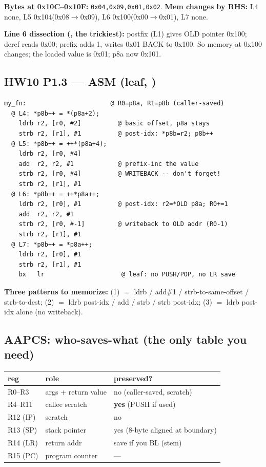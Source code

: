 \textbf{Bytes at 0x10C--0x10F:} \texttt{0x04,0x09,0x01,0x02}.
\textbf{Mem changes by RHS:} L4 none, L5 0x104(0x08$\to$0x09), L6 0x100(0x00$\to$0x01), L7 none.

\textbf{Line 6 dissection (, the trickiest):}
postfix  (L1) gives OLD pointer 0x100; deref reads 0x00; prefix
\cee{++} adds 1, writes 0x01 BACK to 0x100. So memory at 0x100 changes; the
loaded value is 0x01; p8a now 0x101.

\subsection{HW10 P1.3 --- ASM (leaf, )}
\begin{lstlisting}
my_fn:                       @ R0=p8a, R1=p8b (caller-saved)
  @ L4: *p8b++ = *(p8a+2);
    ldrb r2, [r0, #2]          @ basic offset, p8a stays
    strb r2, [r1], #1          @ post-idx: *p8b=r2; p8b++
  @ L5: *p8b++ = ++*(p8a+4);
    ldrb r2, [r0, #4]
    add  r2, r2, #1            @ prefix-inc the value
    strb r2, [r0, #4]          @ WRITEBACK -- don't forget!
    strb r2, [r1], #1
  @ L6: *p8b++ = ++*p8a++;
    ldrb r2, [r0], #1          @ post-idx: r2=*OLD p8a; R0+=1
    add  r2, r2, #1
    strb r2, [r0, #-1]         @ writeback to OLD addr (R0-1)
    strb r2, [r1], #1
  @ L7: *p8b++ = *p8a++;
    ldrb r2, [r0], #1
    strb r2, [r1], #1
    bx   lr                     @ leaf: no PUSH/POP, no LR save
\end{lstlisting}

\textbf{Three patterns to memorize:}
(1)  $=$ ldrb / add\#1 / strb-to-same-offset / strb-to-dest;
(2)      $=$ ldrb post-idx / add / strb \asm{[\#-1]} / strb post-idx;
(3)        $=$ ldrb post-idx alone (no writeback).

\subsection{AAPCS: who-saves-what (the only table you need)}
\begin{tabular}{@{}lll@{}}
\toprule
reg & role & preserved? \\
\midrule
R0--R3 & args + return value & no (caller-saved, scratch) \\
R4--R11& callee scratch       & \textbf{yes} (PUSH if used) \\
R12 (IP)& scratch              & no \\
R13 (SP)& stack pointer        & yes (8-byte aligned at boundary) \\
R14 (LR)& return addr          & save if you BL (stem) \\
R15 (PC)& program counter      & --- \\
\bottomrule
\end{tabular}

